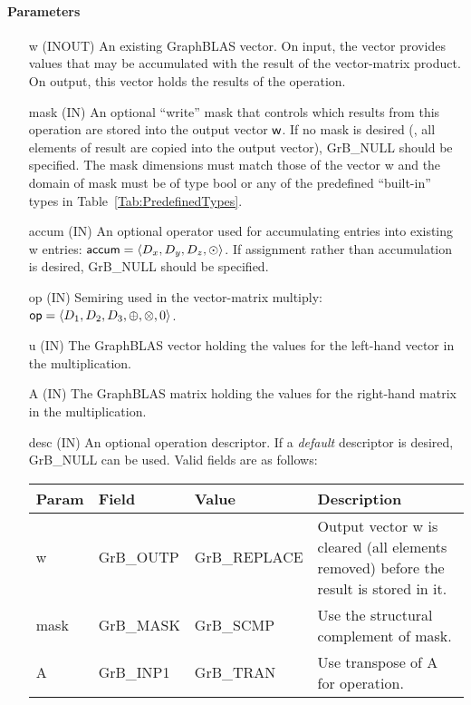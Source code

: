 \paragraph{Parameters}

\begin{itemize}[leftmargin=1.1in]
    \item[{\sf w}]    ({\sf INOUT}) An existing GraphBLAS vector.  On input,
    the vector provides values that may be accumulated with the result of the
    vector-matrix product.  On output, this vector holds the results of the
    operation.

    \item[{\sf mask}] ({\sf IN}) An optional ``write'' mask that controls which
    results from this operation are stored into the output vector
    ${\sf w}$.  If no mask is desired (\ie, all elements
    of result are copied into the output vector), {\sf GrB\_NULL}
    should be specified. The mask dimensions must match those of the
    vector {\sf w} and the domain of {\sf mask} must be
    of type {\sf bool} or any of the predefined ``built-in'' types in
    Table~\ref{Tab:PredefinedTypes}.

    \item[{\sf accum}] ({\sf IN}) An optional operator used for accumulating
    entries into existing {\sf w} entries: ${\sf accum} = \langle D_x,
    D_y, D_z,\odot \rangle$. If assignment rather than accumulation is
    desired, {\sf GrB\_NULL} should be specified.

    \item[{\sf op}]   ({\sf IN}) Semiring used in the vector-matrix
    multiply: ${\sf op}=\langle D_1,D_2,D_3,\oplus,\otimes,0 \rangle$.
    
    \item[{\sf u}]    ({\sf IN}) The GraphBLAS vector holding the values for
    the left-hand vector in the multiplication.
    
    \item[{\sf A}]    ({\sf IN}) The GraphBLAS matrix holding the values
    for the right-hand matrix in the multiplication.

    \item[{\sf desc}] ({\sf IN}) An optional operation descriptor.  If
    a \emph{default} descriptor is desired, {\sf GrB\_NULL} can be
    used.  Valid fields are as follows: \\
    
    \begin{tabular}{lllp{2.5in}}
    Param & Field  & Value & Description \\
    \hline
    {\sf w}    & {\sf GrB\_OUTP} & {\sf GrB\_REPLACE} & Output vector {\sf w} is cleared (all elements removed) before the result is stored in it.\\
    {\sf mask} & {\sf GrB\_MASK} & {\sf GrB\_SCMP}   & Use the structural complement of {\sf mask}. \\
    {\sf A}    & {\sf GrB\_INP1} & {\sf GrB\_TRAN}   & Use transpose of {\sf A} for operation. \\
    \end{tabular}
\end{itemize}

